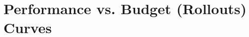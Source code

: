 \documentclass{article} %
\begin{document}
    

\section{Performance vs. Budget (Rollouts) Curves}\label{appendix_perf_vs_rollout_curves}
\end{document}
